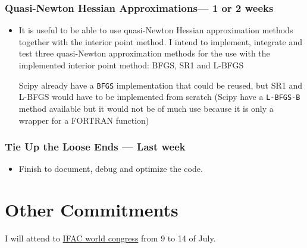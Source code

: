 \documentclass[11pt]{article}
\begin{document}
\subsubsection*{Quasi-Newton Hessian Approximations\footnotemark --- 1 or 2 weeks}



\begin{itemize}
\item
  It is useful to be able to use quasi-Newton Hessian approximation
  methods together with the interior point method. I intend to implement,
  integrate and test three quasi-Newton approximation methods
  for the use with the implemented interior point method:
  BFGS, SR1 and L-BFGS~\cite[Cap. 6 \& 7]{nocedal2006numerical}

  Scipy already have a \texttt{BFGS} implementation that could be reused,
  but SR1 and L-BFGS would have to be implemented from scratch (Scipy have
  a \texttt{L-BFGS-B} method available but it would not be of much use
  because it is only a wrapper for a FORTRAN function)
\end{itemize}



\subsubsection*{Tie Up the Loose Ends --- Last week}

\begin{itemize}
\item
  Finish to document, debug and optimize the code.
\end{itemize}



\section*{Other Commitments}

I will attend to \href{https://www.ifac2017.org}{IFAC world congress} from 9 to 14 of July.



\end{document}
